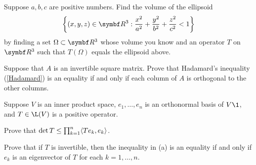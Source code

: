 \begin{exercises}

\exercise
Suppose $a, b, c$ are positive numbers.  Find the volume of the ellipsoid
\[
\br[\bigg]{ (x, y, z) \in \R{3}: \frac{x^2}{a^2} + \frac{y^2}{b^2} + \frac{z^2}{c^2} < 1 }
\]
by finding a set $\Omega \subset \R{3}$ whose volume you know and an operator
$T$ on $\R{3}$ such that $T(\Omega)$ equals the ellipsoid above.


\exercise
Suppose that $A$ is an invertible square matrix. Prove that Hadamard's \mbox{inequality} (\ref{Hadamard}) is an equality if and only if each column of $A$ is orthogonal to the other columns.\label{7HadEq}


\exercise
Suppose $V$ is an inner product space, $e_1, \ldots, e_n$ is an orthonormal basis of $V\1$, and $T \in \L(V)$ is a positive operator.
\begin{subtheorem}
\item
Prove that $\det T \le \prod_{k=1}^n \langle Te_k, e_k\rangle$.
\item
Prove that if $T$ is invertible, then the inequality in (a) is an equality if and only if $e_k$ is an eigenvector of $T$ for each
$k = 1, \ldots, n$.
\end{subtheorem}
\exercisesubtheoremend



\end{exercises}
